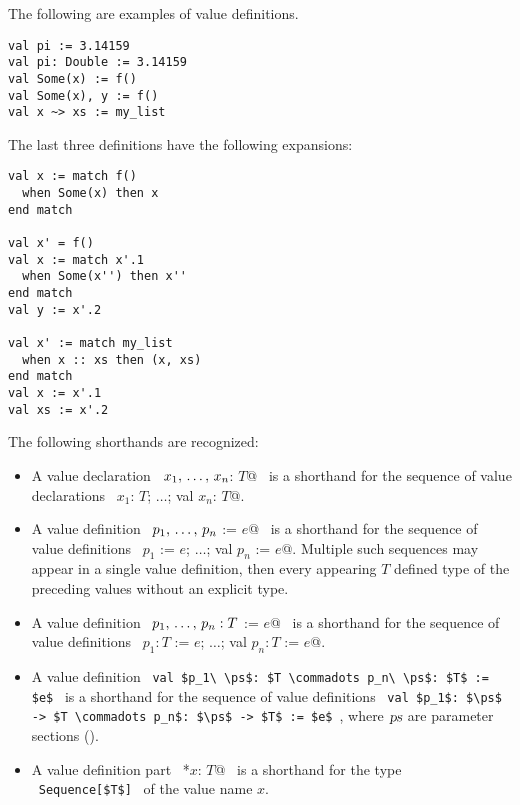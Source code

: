 \example The following are examples of value definitions. 
\begin{lstlisting}
val pi := 3.14159
val pi: Double := 3.14159
val Some(x) := f() 
val Some(x), y := f()
val x ~> xs := my_list
\end{lstlisting}

The last three definitions have the following expansions:
\begin{lstlisting}[escapechar=@]
val x := match f()
  when Some(x) then x
end match

val x' = f()
val x := match x'.1
  when Some(x'') then x''
end match
val y := x'.2

val x' := match my_list
  when x :: xs then (x, xs)
end match
val x := x'.1
val xs := x'.2
\end{lstlisting}

The following shorthands are recognized: 
\begin{itemize}
  \item[] A value declaration ~\lstinline@val $x_1 ,\, \ldots ,\, x_n$: $T$@~ is a shorthand for the sequence of value declarations ~\lstinline@val $x_1$: $T$; $\ldots$; val $x_n$: $T$@. 

  \item[] A value definition ~\lstinline@val $p_1 ,\, \ldots ,\, p_n$ := $e$@~ is a shorthand for the sequence of value definitions ~\lstinline@val $p_1$ := $e$; $\ldots$; val $p_n$ := $e$@. Multiple such sequences may appear in a single value definition, then every appearing $T$ defined type of the preceding values without an explicit type. 

  \item[] A value definition ~\lstinline@val $p_1 ,\, \ldots ,\, p_n: T$ := $e$@~ is a shorthand for the sequence of value definitions ~\lstinline@val $p_1: T$ := $e$; $\ldots$; val $p_n: T$ := $e$@.

  \item[] A value definition ~\lstinline!val $p_1\ \ps$: $T \commadots p_n\ \ps$: $T$ := $e$!~ is a shorthand for the sequence of value definitions ~\lstinline!val $p_1$: $\ps$ -> $T \commadots p_n$: $\ps$ -> $T$ := $e$!~, where $\mbox{\sl ps}$ are parameter sections ().

  \item[] A value definition part ~\lstinline@*$x$: $T$@~ is a shorthand for the type ~\lstinline!Sequence[$T$]!~ of the value name $x$. 
\end{itemize}





